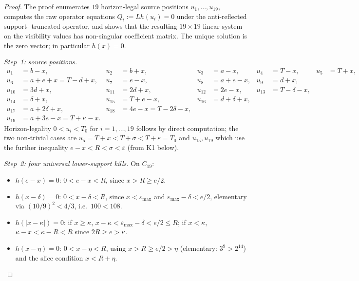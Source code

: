 \begin{proof}
The proof enumerates $19$ horizon-legal source positions
$u_{1}, \ldots, u_{19}$, computes the raw operator equations
$Q_{i} := L h(u_{i}) = 0$ under the anti-reflected support-
truncated operator, and shows that the resulting
$19 \times 19$ linear system on the visibility values has
non-singular coefficient matrix.  The unique solution is
the zero vector; in particular $h(x) = 0$.

\smallskip
\noindent\emph{Step~1: source positions.}
\[
\begin{aligned}
u_{1} &= b - x, & u_{2} &= b + x, & u_{3} &= a - x, & u_{4} &= T - x, & u_{5} &= T + x,\\
u_{6} &= a + e + x = T - d + x, & u_{7} &= e - x, & u_{8} &= a + e - x, & u_{9} &= d + x,\\
u_{10} &= 3d + x, & u_{11} &= 2d + x, & u_{12} &= 2e - x, & u_{13} &= T - \delta - x,\\
u_{14} &= \delta + x, & u_{15} &= T + e - x, & u_{16} &= d + \delta + x,\\
u_{17} &= a + 2\delta + x, & u_{18} &= 4e - x = T - 2\delta - x,\\
u_{19} &= a + 3e - x = T + \kappa - x.
\end{aligned}
\]
Horizon-legality $0 < u_{i} < T_{0}$ for $i = 1, \ldots, 19$ follows
by direct computation; the two non-trivial cases are
$u_{5} = T + x < T + \sigma < T + \varepsilon = T_{0}$ and
$u_{15}, u_{19}$ which use the further inequality $e - x < R < \sigma
< \varepsilon$ (from K1 below).

\smallskip
\noindent\emph{Step~2: four universal lower-support kills.}
On $C_{19}$:
\begin{itemize}
\item[(K1)] $h(e - x) = 0$: $0 < e - x < R$, since $x > R \ge e/2$.
\item[(K2)] $h(x - \delta) = 0$: $0 < x - \delta < R$, since
  $x < \varepsilon_{\max}$ and $\varepsilon_{\max} - \delta < e/2$,
  elementary via $(10/9)^{2} < 4/3$, i.e.\ $100 < 108$.
\item[(K3)] $h(|x - \kappa|) = 0$: if $x \ge \kappa$, $x - \kappa <
  \varepsilon_{\max} - \delta < e/2 \le R$; if $x < \kappa$,
  $\kappa - x < \kappa - R < R$ since $2R \ge e > \kappa$.
\item[(K4)] $h(x - \eta) = 0$: $0 < x - \eta < R$, using
  $x > R \ge e/2 > \eta$ (elementary: $3^{9} > 2^{14}$) and
  the slice condition $x < R + \eta$.
\end{itemize}


\end{proof}
